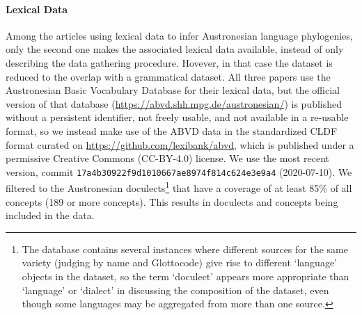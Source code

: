 \documentclass[]{rsos}%
\begin{document}
\paragraph{Lexical Data}
Among the articles using lexical data to infer Austronesian language phylogenies, only the second one
\parencite{greenhill2018population} makes the associated lexical data available, instead of only describing the data gathering procedure.
Hovever, in that case the dataset is reduced to the overlap with a grammatical dataset.
All three papers use the Austronesian Basic Vocabulary Database for their lexical data, but the official version of that database
(\url{https://abvd.shh.mpg.de/austronesian/}) is published without a persistent identifier, not freely usable, and not available in a re-usable format, so we instead make use of the ABVD
data in the standardized CLDF format \parencite{cldf} curated on \url{https://github.com/lexibank/abvd}, which is published under a
permissive Creative Commons (CC-BY-4.0) license. We use the most recent version, commit \texttt{17a4b30922f9d1010667ae8974f814c624e3e9a4}
(2020-07-10). We filtered to the Austronesian doculects\footnote{The database contains several instances where different
sources for the same variety (judging by name and Glottocode) give rise to different ‘language’ objects in the dataset, so the term
‘doculect’ appears more appropriate than ‘language’ or ‘dialect’ in discussing the composition of the dataset, even though some languages may be aggregated from more than one source.} that have a coverage
of at least 85\% of all concepts (189 or more concepts). This results in \countlects{} doculects and \countconcepts{} concepts being included in the data.
\end{document}
